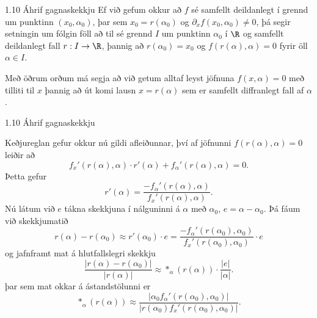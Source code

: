 \begin{frame}{1.10 Áhrif gagnaskekkju} 
Ef við gefum okkur að $f$ sé samfellt deildanlegt í grennd um punktinn
$(x_0,\alpha_0)$, þar sem $x_0=r(\alpha_0)$ og
${\partial}_xf(x_0,\alpha_0)\neq 0$, þá segir setningin um fólgin föll
að til sé grennd $I$ um punktinn $\alpha_0$ í $\R$ og samfellt
deildanlegt fall $r:I\to \R$, þannig að $r(\alpha_0)=x_0$ og
$f(r(\alpha),\alpha)=0$ fyrir öll $\alpha\in I$.

\pause
\smallskip
 Með öðrum orðum má
segja að við getum alltaf leyst jöfnuna $f(x,\alpha)=0$ með tilliti
til $x$ þannig að út komi lausn $x=r(\alpha)$ sem er samfellt
diffranlegt fall af $\alpha$. 
\end{frame}

\begin{frame}{1.10 Áhrif gagnaskekkju} 


Keðjureglan gefur okkur nú gildi
afleiðunnar, því af jöfnunni $f(r(\alpha),\alpha)=0$ leiðir að  
\begin{equation*}
    f_x'(r(\alpha), \alpha)\cdot r'(\alpha) 
    + f_{\alpha}'(r(\alpha),
    \alpha) = 0.
\end{equation*}\pause
Þetta gefur
\begin{equation*}
    r'(\alpha) = \frac{-f_{\alpha}'(r(\alpha),\alpha)}
        {f_x'(r(\alpha),\alpha)}.
\end{equation*}\pause
Nú látum við $e$ tákna skekkjuna í nálguninni á $\alpha$ með
$\alpha_0$, $e=\alpha-\alpha_0$. Þá fáum við skekkjumatið
\begin{equation*}
    r(\alpha) - r(\alpha_0) \approx r'(\alpha_0)\cdot e 
    = \frac{-f_{\alpha}'(r(\alpha_0),\alpha_0)}
        {f_x'(r(\alpha_0),\alpha_0)}\cdot e
\end{equation*}
\pause
og jafnframt mat á hlutfallslegri skekkju
\begin{equation*}
    \dfrac{|r(\alpha) - r(\alpha_0)|}
    {|r(\alpha)|} \approx \ast_\alpha(r(\alpha))\cdot
    \dfrac{|e|}{|\alpha|}. 
\end{equation*}
þar sem mat okkar á ástandstölunni er
\begin{equation*}
    \ast_\alpha(r(\alpha))
    \approx \frac{|\alpha_0f_
    {\alpha}'(r(\alpha_0),\alpha_0)|}
    {|r(\alpha_0)f_x'(r(\alpha_0),\alpha_0)|}.
\end{equation*}
\end{frame}
%

